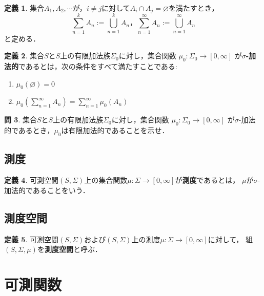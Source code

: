 \documentclass{jsreport}
\theoremstyle{definition}
\newtheorem{defi}{定義}[section]
\newtheorem{qst}[defi]{問}
\begin{document}
\begin{defi}\label{def_disjoint_union}
集合$A_1,A_2,\cdots$が，$i \neq j$に対して$A_i \cap A_j=\varnothing$を満たすとき，
\[ \sum_{n=1}^k A_n:=\bigcup_{n=1}^k A_n，\sum_{n=1}^\infty A_n:=\bigcup_{n=1}^\infty A_n \]
と定める．
\end{defi}

\begin{defi}\label{def_countably_additive}
集合$S$と$S$上の有限加法族$\Sigma_0$に対し，集合関数
$\mu_0\colon\Sigma_0\to[0,\infty]$
が\textbf{$\sigma$-加法的}であるとは，次の条件をすべて満たすことである:
\begin{enumerate}
\item$\mu_0(\varnothing)=0$
\item$\displaystyle\mu_0\left(\sum_{n=1}^\infty A_n\right)=\sum_{n=1}^\infty\mu_0(A_n)$
\end{enumerate}
\end{defi}

\begin{qst}\label{qst_countably_additive_then_additive}
集合$S$と$S$上の有限加法族$\Sigma_0$に対し，集合関数
$\mu_0\colon\Sigma_0\to[0,\infty]$
が$\sigma$-加法的であるとき，$\mu_0$は有限加法的であることを示せ．
\end{qst}

\section{測度}

\begin{defi}\label{def_measure}
可測空間$(S,\Sigma)$上の集合関数$\mu \colon \Sigma\to[0,\infty]$が\textbf{測度}であるとは，
$\mu$が$\sigma$-加法的であることをいう．
\end{defi}

\section{測度空間}

\begin{defi}\label{def_measure_space}
可測空間$(S,\Sigma)$および$(S,\Sigma)$上の測度$\mu \colon \Sigma\to[0,\infty]$に対して，
組$(S,\Sigma,\mu)$を\textbf{測度空間}と呼ぶ．
\end{defi}

\chapter{可測関数}
\end{document}
